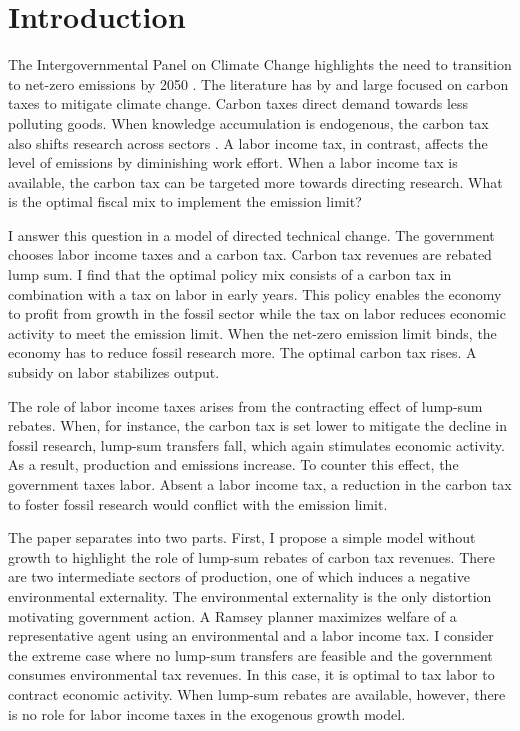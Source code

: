 \clearpage
\section{Introduction}

The Intergovernmental Panel on Climate Change highlights the need to transition to net-zero emissions by 2050 \citep{IPCC2022}. The literature has by and large focused on carbon taxes to mitigate climate change. Carbon taxes direct demand towards less polluting goods. When knowledge accumulation is endogenous, the carbon tax also shifts research across sectors \citep{Acemoglu2012TheChange}. A labor income tax, in contrast, affects the level of emissions by diminishing work effort. When a labor income tax is available, the carbon tax can be targeted more towards directing research. 
What is the optimal fiscal mix to implement the emission limit?

I answer this question in a model of directed technical change. The government chooses labor income taxes and a carbon tax. Carbon tax revenues are rebated lump sum. I find that the optimal policy mix consists of a carbon tax in combination with a tax on labor in early years. This policy enables the economy to profit from growth in the fossil sector while the tax on labor reduces economic activity to meet the emission limit. When the net-zero emission limit binds, the economy has to reduce fossil research more. The optimal carbon tax rises. A subsidy on labor stabilizes output. 

The role of labor income taxes arises from the contracting effect of lump-sum rebates. When, for instance, the carbon tax is set lower to mitigate the decline in fossil research, lump-sum transfers fall, which again stimulates economic activity. As a result, production and emissions increase. To counter this effect, the government taxes labor. Absent a labor income tax, a reduction in the carbon tax to foster fossil research would conflict with the emission limit.

The paper separates into two parts. First, I propose a simple model without growth to highlight the role of lump-sum rebates of carbon tax revenues. There are two intermediate sectors of production, one of which induces a negative environmental externality. The environmental externality is the only distortion motivating government action. A Ramsey planner maximizes welfare of a representative agent using an environmental and a labor income tax. I consider the extreme case where no lump-sum transfers are feasible and the government consumes environmental tax revenues. In this case, it is optimal to tax labor to contract economic activity. When lump-sum rebates are available, however, there is no role for labor income taxes in the exogenous growth model. 

